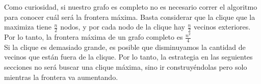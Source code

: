 Como curiosidad, si nuestro grafo es completo no es necesario correr el algoritmo para conocer cuál será la frontera máxima. Basta considerar que la clique que la maximiza tiene $\frac{n}{2}$ nodos, y por cada nodo de la clique hay $\frac{n}{2}$ vecinos exteriores. Por lo tanto, la frontera máxima de un grafo completo es $\frac{n^2}{4}$ \\

Si la clique es demasiado grande, es posible que disminuyamos la cantidad de vecinos que están fuera de la clique. Por lo tanto, la estrategia en las seguientes secciones no será buscar una clique máxima, sino ir construyéndolas pero solo mientras la frontera va aumentando. \\

